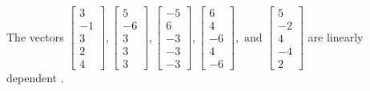 \begin{exercise}
\begin{exerciseStatement}
  \end{exerciseStatement}
  \begin{exerciseAnswer}
   The vectors \(\left[\begin{array}{r}
3 \\
-1 \\
3 \\
2 \\
4
\end{array}\right] , \left[\begin{array}{r}
5 \\
-6 \\
3 \\
3 \\
3
\end{array}\right] , \left[\begin{array}{r}
-5 \\
6 \\
-3 \\
-3 \\
-3
\end{array}\right] , \left[\begin{array}{r}
6 \\
4 \\
-6 \\
4 \\
-6
\end{array}\right] , \text{ and } \left[\begin{array}{r}
5 \\
-2 \\
4 \\
-4 \\
2
\end{array}\right]\) are 
  	 linearly dependent  .
  


  \end{exerciseAnswer}
\end{exercise}